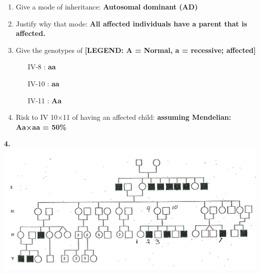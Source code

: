 \documentclass[plain,basic]{inVerba-notes}
\begin{document}
    \begin{enumerate}[label=\alph*]
        \item Give a mode of inheritance: \textbf{Autosomal dominant (AD)}
        \item Justify why that mode: \textbf{All affected individuals have a parent that is affected.}
        \item Give the genotypes of \textbf{[LEGEND: A = Normal, a = recessive; affected]}
        \begin{multicols}{3}
            \begin{enumerate}
                \item[IV-8]: \textbf{aa}
                \item[IV-10]: \textbf{aa}
                \item[IV-11]: \textbf{Aa}
            \end{enumerate}
        \end{multicols}
        \item Risk to IV 10×11 of having an affected child: \textbf{assuming Mendelian: Aa×aa = 50\%}
    \end{enumerate}
    \begin{center}
        \textbf{4.}\hspace{10pt}\includegraphics[scale=0.35,angle=-0.15,origin=c]{images/pedigree-4.png}
    \end{center}
\end{document}
